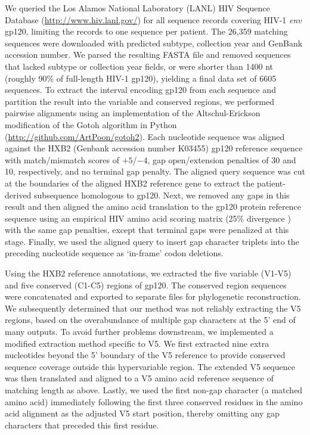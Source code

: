 \documentclass[12pt]{article}
\begin{document}
We queried the Los Alamos National Laboratory (LANL) HIV Sequence Database (\url{http://www.hiv.lanl.gov/}) for all sequence records covering HIV-1 \textit{env} gp120, limiting the records to one sequence per patient.
The 26,359 matching sequences were downloaded with predicted subtype, collection year and GenBank accession number.
We parsed the resulting FASTA file and removed sequences that lacked subtype or collection year fields, or were shorter than 1400 nt (roughly 90\% of full-length HIV-1 gp120), yielding a final data set of 6605 sequences.
To extract the interval encoding gp120 from each sequence and partition the result into the variable and conserved regions, we performed pairwise alignments using an implementation of the Altschul-Erickson \citep{altschul1986optimal} modification of the Gotoh algorithm in Python (\url{http://github.com/ArtPoon/gotoh2}).
Each nucleotide sequence was aligned against the HXB2 (Genbank accession number K03455) gp120 reference sequence with match/mismatch scores of $+5$/$-4$, gap open/extension penalties of 30 and 10, respectively, and no terminal gap penalty.
The aligned query sequence was cut at the boundaries of the aligned HXB2 reference gene to extract the patient-derived subsequence homologous to gp120.
Next, we removed any gaps in this result and then aligned the amino acid translation to the gp120 protein reference sequence using an empirical HIV amino acid scoring matrix (25\% divergence \citep{nickle2007hiv}) with the same gap penalties, except that terminal gaps were penalized at this stage.
Finally, we used the aligned query to insert gap character triplets into the preceding nucleotide sequence as `in-frame' codon deletions.

Using the HXB2 reference annotations, we extracted the five variable (V1-V5) and five conserved (C1-C5) regions of gp120.  
The conserved region sequences were concatenated and exported to separate files for phylogenetic reconstruction.
We subsequently determined that our method was not reliably extracting the V5 regions, based on the overabundance of multiple gap characters at the 5' end of many outputs. 
To avoid further problems downstream, we implemented a modified extraction method specific to V5.
We first extracted nine extra nucleotides beyond the 5' boundary of the V5 reference to provide conserved sequence coverage outside this hypervariable region. 
The extended V5 sequence was then translated and aligned to a V5 amino acid reference sequence of matching length as above. 
Lastly, we used the first non-gap character (a matched amino acid) immediately following the first three conserved residues in the amino acid alignment as the adjusted V5 start position, thereby omitting any gap characters that preceded this first residue.  
\end{document}
